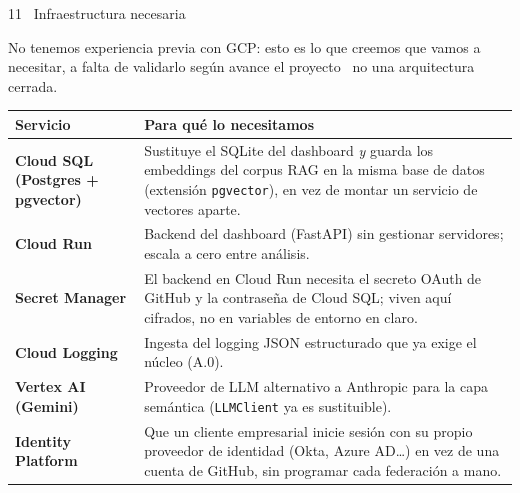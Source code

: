 \documentclass[9pt,aspectratio=169]{beamer}
\begin{document}
\begin{frame}{11 \textperiodcentered\ Infraestructura necesaria}
\par\vspace{4pt}
{\color{inksoft}\footnotesize No tenemos experiencia previa con GCP: esto es lo que creemos que vamos a necesitar, a falta de validarlo según avance el proyecto \textemdash\ no una arquitectura cerrada.}

\vspace{1pt}
\centering
{\fontsize{7.3}{8.7}\selectfont
\renewcommand{\arraystretch}{1.15}
\begin{tabular}{@{}p{2.35cm} p{9.5cm}@{}}
\toprule
\textbf{\footnotesize Servicio} & \textbf{\footnotesize Para qué lo necesitamos} \\
\midrule
\textbf{Cloud SQL (Postgres + pgvector)} & Sustituye el SQLite del dashboard \emph{y} guarda los embeddings del corpus RAG en la misma base de datos (extensión \texttt{pgvector}), en vez de montar un servicio de vectores aparte. \\
\textbf{Cloud Run} & Backend del dashboard (FastAPI) sin gestionar servidores; escala a cero entre análisis. \\
\textbf{Secret Manager} & El backend en Cloud Run necesita el secreto OAuth de GitHub y la contraseña de Cloud SQL; viven aquí cifrados, no en variables de entorno en claro. \\
\textbf{Cloud Logging} & Ingesta del logging JSON estructurado que ya exige el núcleo (A.0). \\
\textbf{Vertex AI (Gemini)} & Proveedor de LLM alternativo a Anthropic para la capa semántica (\texttt{LLMClient} ya es sustituible). \\
\textbf{Identity Platform} & Que un cliente empresarial inicie sesión con su propio proveedor de identidad (Okta, Azure AD\ldots) en vez de una cuenta de GitHub, sin programar cada federación a mano. \\
\bottomrule
\end{tabular}
}
\end{frame}
\end{document}
